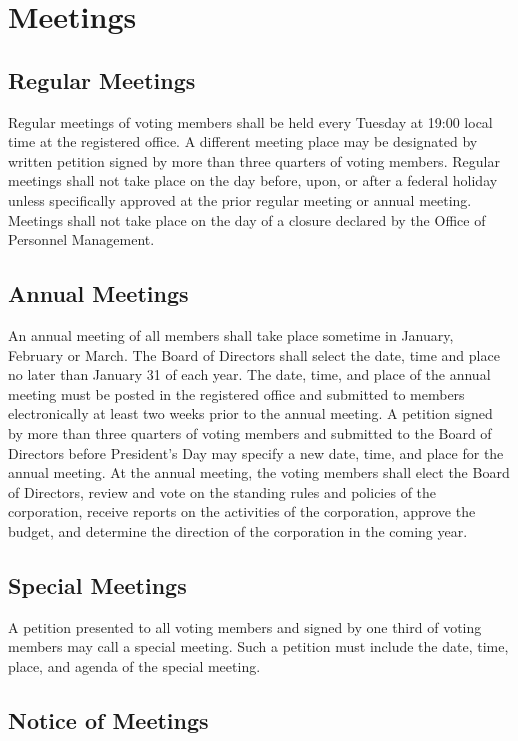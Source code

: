 \documentclass[10pt,letterpaper,titlepage]{article}
\begin{document}
\section{Meetings}

\subsection{Regular Meetings}

Regular meetings of voting members shall be held every Tuesday at 19:00 local
time at the registered office.
A different meeting place may be designated by written petition signed by more
than three quarters of voting members.
Regular meetings shall not take place on the day before, upon, or after a
federal holiday unless specifically approved at the prior regular meeting or
annual meeting.
Meetings shall not take place on the day of a closure declared by the Office of
Personnel Management.

\subsection{Annual Meetings}

An annual meeting of all members shall take place sometime in January, February
or March.
The Board of Directors shall select the date, time and place no later than
January 31 of each year.
The date, time, and place of the annual meeting must be posted in the registered
office and submitted to members electronically at least two weeks prior to the
annual meeting.
A petition signed by more than three quarters of voting members
and submitted to the Board of Directors before President's Day may specify a
new date, time, and place for the annual meeting.
At the annual meeting, the voting members shall elect the Board of Directors,
review and vote on the standing rules and policies of the corporation, receive
reports on the activities of the corporation, approve the budget, and determine
the direction of the corporation in the coming year.

\subsection{Special Meetings}
\label{specialmeet}

A petition presented to all voting members and signed by one third of voting
members may call a special meeting.  Such a petition must include the date,
time, place, and agenda of the special meeting.

\subsection{Notice of Meetings}
\end{document}
